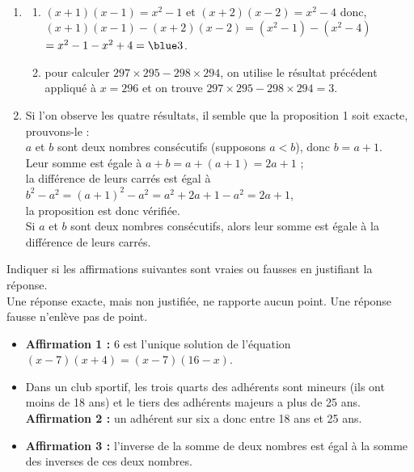 \begin{corrige}
\ \\ [-5mm]
   \begin{enumerate}
      \item
      \begin{enumerate}
         \item $(x+1)(x-1) =x^2-1$ et $(x+2)(x-2) =x^2-4$ donc, \\
            $(x+1)(x-1)-(x+2)(x-2) =(x^2-1)-(x^2-4)$ \\
            \hspace*{4.35cm} $=x^2-1-x^2+4 ={\blue 3}$.
         \item pour calculer $297\times295-298\times294$, on utilise le résultat précédent appliqué à $x =296$ et on trouve {\blue $297\times295-298\times294 =3$}.
      \end{enumerate}
      \setcounter{enumi}{1}
      \item Si l'on observe les quatre résultats, il semble que la proposition 1 soit exacte, prouvons-le : \\
         $a$ et $b$ sont deux nombres consécutifs (supposons $a<b$), donc $b =a+1$. \\
         Leur somme est égale à $a+b =a+(a+1) =2a+1$ ; \\
         la différence de leurs carrés est égal à $b^2-a^2 =(a+1)^2-a^2 =a^2+2a+1-a^2 =2a+1$, \\
            la proposition est donc vérifiée. \\
           {\blue Si $a$ et $b$ sont deux nombres consécutifs, alors leur somme est égale à la différence de leurs carrés}.    
   \end{enumerate}
\end{corrige}


\bigskip


\begin{exercice}[CRPE 2017 G1 et G2, 2018 G1] %
   Indiquer si les affirmations suivantes sont vraies ou fausses en justifiant la réponse. \\
   Une réponse exacte, mais non justifiée, ne rapporte aucun point. Une réponse fausse n’enlève pas de point.
   \begin{itemize}
      \item {\bf Affirmation 1 :} 6 est l’unique solution de l’équation $(x - 7)(x + 4) = (x -7)(16 - x)$.
      \item Dans un club sportif, les trois quarts des adhérents sont mineurs (ils ont moins de 18 ans) et le tiers des adhérents majeurs a plus de 25 ans. {\bf Affirmation 2 :} un adhérent sur six a donc entre 18 ans et 25 ans.
      \item {\bf Affirmation 3 :} l'inverse de la somme de deux nombres est égal à la somme des
inverses de ces deux nombres.
   \end{itemize}
\end{exercice}

